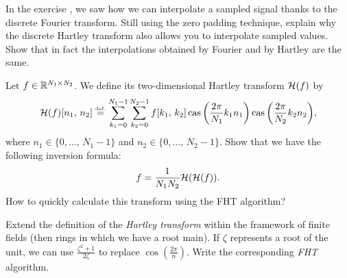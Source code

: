  
\begin{exo}
\label{exo-interpolation-transfo-hartley}
 
  In the exercise , we saw how we can interpolate a sampled signal thanks to the discrete Fourier transform. Still using the zero padding technique, explain why the discrete Hartley transform also allows you to interpolate sampled values. Show that in fact the interpolations obtained by Fourier and by Hartley are the same.
\end{exo}
 
 
\begin{exo}
\label{exo-transfo-hartley-2d}
 
  Let $ f \in \mathbb{R}^{N_1 \times N_2} $. We define its two-dimensional Hartley transform $ \mathcal{H} (f) $ by
\begin{equation*}
\mathcal{H} (f) [n_1, \, n_2] \stackrel{\mbox{\upshape\tiny def.}}{=} \sum_{k_1 = 0}^{N_1-1}{\sum_{k_2 = 0}^{N_2-1}{f [k_1, \, k_2] \operatorname{cas} \left(\frac{2 \pi}{N_1} k_1 n_1 \right) \operatorname{cas} \left(\frac{2 \pi}{N_2} k_2 n_2 \right)}},
\end{equation*}
where $ n_1 \in \{0, \ldots, \, N_1-1 \} $ and $ n_2 \in \{0, \ldots, \, N_2-1 \} $. Show that we have the following inversion formula:
\begin{equation*}
f = \frac{1}{N_1 N_2} \mathcal{H} (\mathcal{H} (f)).
\end{equation*}
How to quickly calculate this transform using the FHT algorithm?
\end{exo}
 
 
\begin{exo}
\label{exo-transfo-hartley-corps-finis}
 
 Extend the definition of the \textit{Hartley transform} within the framework of finite fields (then rings in which we have a root  main). If $ \zeta $ represents a  root of the unit, we can use $ \frac{\zeta^2 + 1}{2 \zeta} $ to replace $ \cos \left(\frac{2 \pi}{n} \right) $. Write the corresponding \textit{FHT} algorithm.
\end{exo}
 
